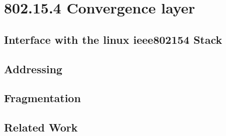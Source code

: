 \chapter{802.15.4 Convergence layer}
\section{Interface with the linux ieee802154 Stack}
\section{Addressing}
\section{Fragmentation}
\section{Related Work}
